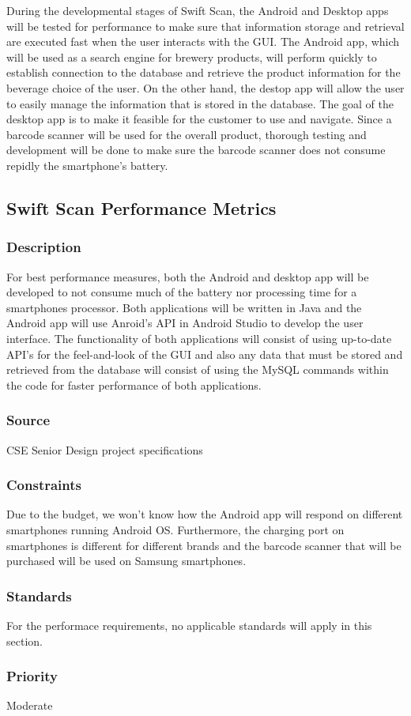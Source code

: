 During the developmental stages of Swift Scan, the Android and Desktop apps will be tested for performance to make sure that information storage and retrieval are executed fast when the user interacts with the GUI.  The Android app, which will be used as a search engine for brewery products, will perform quickly to establish connection to the database and retrieve the product information for the beverage choice of the user.  On the other hand, the destop app will allow the user to easily manage the information that is stored in the database.  The goal of the desktop app is to make it feasible for the customer to use and navigate.  Since a barcode scanner will be used for the overall product, thorough testing and development will be done to make sure the barcode scanner does not consume repidly the smartphone's battery.

\subsection{Swift Scan Performance Metrics}
\subsubsection{Description}
For best performance measures, both the Android and desktop app will be developed to not consume much of the battery nor processing time for a smartphones processor.  Both applications will be written in Java and the Android app will use Anroid's API in Android Studio to develop the user interface.  The functionality of both applications will consist of using up-to-date API's for the feel-and-look of the GUI and also any data that must be stored and retrieved from the database will consist of using the MySQL commands within the code for faster performance of both applications. 
\subsubsection{Source}
CSE Senior Design project specifications
\subsubsection{Constraints}
Due to the budget, we won't know how the Android app will respond on different smartphones running Android OS.  Furthermore, the charging port on smartphones is different for different brands and the barcode scanner that will be purchased will be used on Samsung smartphones.
\subsubsection{Standards}
For the performace requirements, no applicable standards will apply in this section.
\subsubsection{Priority}
Moderate
